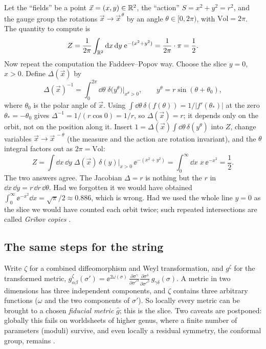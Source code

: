 \begin{example}\label{ex:ghosts:plane}
Let the ``fields'' be a point $\vec x=(x,y)\in\mathbb{R}^2$, the ``action'' $S=x^2+y^2=r^2$, and the
gauge group the rotations $\vec x\to\vec x^{\,\theta}$ by an angle $\theta\in[0,2\pi)$, with
$\mathrm{Vol}=2\pi$. The quantity to compute is
\[
  Z=\frac{1}{2\pi}\int_{\mathbb{R}^2}\mathrm{d} x\,\mathrm{d} y\;\mathrm{e}^{-(x^2+y^2)}=\frac{1}{2\pi}\cdot\pi=\frac12 .
\]
Now repeat the computation the Faddeev--Popov way. Choose the slice $y=0$, $x>0$. Define
$\Delta(\vec x)$ by
\[
  \Delta(\vec x)^{-1}=\int_0^{2\pi}\dd\theta\;\delta\bigl(y^\theta\bigr)\Big|_{x^\theta>0},
  \qquad y^\theta=r\sin(\theta+\theta_0),
\]
where $\theta_0$ is the polar angle of $\vec x$. Using
$\int\dd\theta\,\delta(f(\theta))=1/|f'(\theta_*)|$ at the zero $\theta_*=-\theta_0$ gives
$\Delta^{-1}=1/(r\cos 0)=1/r$, so $\Delta(\vec x)=r$; it depends only on the orbit, not on
the position along it. Insert
$1=\Delta(\vec x)\int\dd\theta\,\delta(y^\theta)$ into $Z$, change variables
$\vec x\to\vec x^{\,-\theta}$ (the measure and the action are rotation invariant), and the
$\theta$ integral factors out as $2\pi=\mathrm{Vol}$:
\[
  Z=\int\dd x\,\dd y\;\Delta(\vec x)\,\delta(y)\Big|_{x>0}\,\ee^{-(x^2+y^2)}
   =\int_0^\infty\dd x\;x\,\ee^{-x^2}=\frac12 .
\]
The two answers agree. The Jacobian $\Delta=r$ is nothing but the $r$ in
$\dd x\,\dd y=r\,\dd r\,\dd\theta$. Had we forgotten it we would have obtained
$\int_0^\infty\ee^{-x^2}\dd x=\sqrt\pi/2\approx0.886$, which is wrong. Had we used the whole
line $y=0$ as the slice we would have counted each orbit twice; such repeated intersections
are called \emph{Gribov copies} .
\end{example}

\subsection{The same steps for the string}

Write $\zeta$ for a combined diffeomorphism and Weyl transformation, and $g^\zeta$ for the
transformed metric,
$g^\zeta_{\alpha\beta}(\sigma')=\ee^{2\omega(\sigma)}\,
\frac{\partial\sigma^\gamma}{\partial\sigma'^\alpha}\frac{\partial\sigma^\delta}{\partial\sigma'^\beta}\,
g_{\gamma\delta}(\sigma)$. A metric in two dimensions has three independent components, and
$\zeta$ contains three arbitrary functions ($\omega$ and the two components of $\sigma'$). So
locally every metric can be brought to a chosen \emph{fiducial metric}
$\hat g$; this is the slice. Two caveats are postponed: globally this fails on worldsheets of
higher genus, where a finite number of parameters (moduli) survive, and even locally a
residual symmetry, the conformal group, remains .

